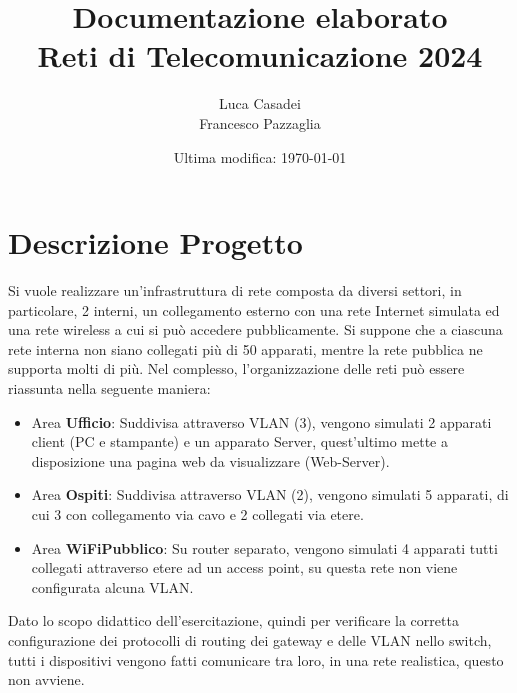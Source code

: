 \documentclass[a4paper]{article}
\title{\textbf{Documentazione elaborato\\Reti di Telecomunicazione 2024}}
\author{Luca Casadei\\Francesco Pazzaglia}
\date{Ultima modifica: \today}
\begin{document}
	\maketitle
	\section{Descrizione Progetto}
	Si vuole realizzare un'infrastruttura di rete composta da diversi settori, in particolare, 2 interni, un collegamento esterno con una rete Internet simulata ed una rete wireless a cui si può accedere pubblicamente. Si suppone che a ciascuna rete interna non siano collegati più di 50 apparati, mentre la rete pubblica ne supporta molti di più. Nel complesso, l'organizzazione delle reti può essere riassunta nella seguente maniera:
	\begin{itemize}
		\item Area \textbf{Ufficio}: Suddivisa attraverso VLAN (3), vengono simulati 2 apparati client (PC e stampante) e un apparato Server, quest'ultimo mette a disposizione una pagina web da visualizzare (Web-Server).
		\item Area \textbf{Ospiti}: Suddivisa attraverso VLAN (2), vengono simulati 5 apparati, di cui 3 con collegamento via cavo e 2 collegati via etere.
		\item Area \textbf{WiFiPubblico}: Su router separato, vengono simulati 4 apparati tutti collegati attraverso etere ad un access point, su questa rete non viene configurata alcuna VLAN.
	\end{itemize}
	Dato lo scopo didattico dell'esercitazione, quindi per verificare la corretta configurazione dei protocolli di routing dei gateway e delle VLAN nello switch, tutti i dispositivi vengono fatti comunicare tra loro, in una rete realistica, questo non avviene.
\end{document}
